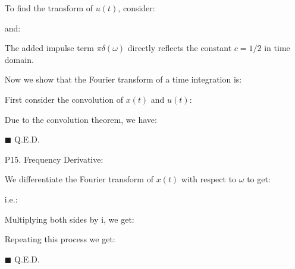 \begin{itemize}
	To find the transform of $u(t)$, consider:
	
	and:
	
	The added impulse term $\pi \delta(\omega)$ directly reflects the constant $c=1/2$ in time domain.
	
	Now we show that the Fourier transform of a time integration is:
	
	
	\begin{dem}
	
	First consider the convolution of $x(t)$ and $u(t)$:
	
	Due to the convolution theorem, we have:
	
	\begin{flushright}
		$\blacksquare$  Q.E.D.
	\end{flushright}
	\end{dem}
	
	\item[P15.] Frequency Derivative:
	
	\begin{dem} We differentiate the Fourier transform of $x(t)$ with
	respect to $\omega$ to get:
	
	i.e.:
	
	Multiplying both sides by $\mathrm{i}$, we get:
	
	Repeating this process we get:
	
	\begin{flushright}
		$\blacksquare$  Q.E.D.
	\end{flushright}
	\end{dem}
	
	\end{itemize}
	
